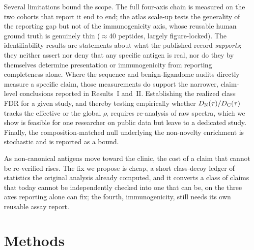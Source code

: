 Several limitations bound the scope. The full four-axis chain is measured on the two cohorts that report it end to end; the atlas scale-up tests the generality of the reporting gap but not of the immunogenicity axis, whose reusable human ground truth is genuinely thin ($\approx$40 peptides, largely figure-locked). The identifiability results are statements about what the published record \emph{supports}; they neither assert nor deny that any specific antigen is real, nor do they by themselves determine presentation or immunogenicity from reporting completeness alone. Where the sequence and benign-ligandome audits directly measure a specific claim, those measurements do support the narrower, claim-level conclusions reported in Results~I and~II. Establishing the realized class FDR for a given study, and thereby testing empirically whether $D_{\mathrm{N}}(\tau)/D_{\mathrm{C}}(\tau)$ tracks the effective or the global $\rho$, requires re-analysis of raw spectra, which we show is feasible for one researcher on public data but leave to a dedicated study. Finally, the composition-matched null underlying the non-novelty enrichment is stochastic and is reported as a bound.

As non-canonical antigens move toward the clinic, the cost of a claim that cannot be re-verified rises. The fix we propose is cheap, a short class-decoy ledger of statistics the original analysis already computed, and it converts a class of claims that today cannot be independently checked into one that can be, on the three axes reporting alone can fix; the fourth, immunogenicity, still needs its own reusable assay report.

\section{Methods}

